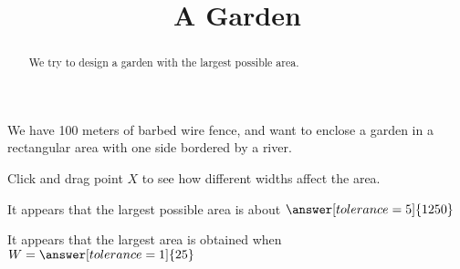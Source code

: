 \documentclass{ximera}
\title{A Garden}
\begin{document}
\begin{abstract}
We try to design a garden with the largest possible area.
\end{abstract}

We have 100 meters of barbed wire fence, and want to enclose a garden in a rectangular area with one side bordered by a river.

\begin{exploration}
Click and drag point $X$ to see how different widths affect the area.

\end{exploration}

\begin{exploration}
It appears that the largest possible area is about $\answer[tolerance=5]{1250}$
\end{exploration}

\begin{problem}
It appears that the largest area is obtained when $W = \answer[tolerance=1]{25}$
\end{problem}
\end{document}
